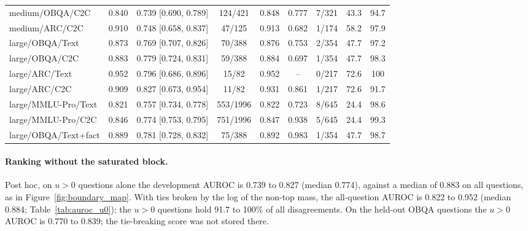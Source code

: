 \begin{table}[!htbp]
\begin{tabular*}{\linewidth}{@{}l@{\hspace{5pt}\extracolsep{\fill}}cccccccc@{}}
medium/OBQA/C2C & 0.840 & 0.739 [0.690, 0.789] & 124/421 & 0.848 & 0.777 & 7/321 & 43.3 & 94.7\\
medium/ARC/C2C & 0.910 & 0.748 [0.658, 0.837] & 47/125 & 0.913 & 0.682 & 1/174 & 58.2 & 97.9\\
large/OBQA/Text & 0.873 & 0.769 [0.707, 0.826] & 70/388 & 0.876 & 0.753 & 2/354 & 47.7 & 97.2\\
large/OBQA/C2C & 0.883 & 0.779 [0.724, 0.831] & 59/388 & 0.884 & 0.697 & 1/354 & 47.7 & 98.3\\
large/ARC/Text & 0.952 & 0.796 [0.686, 0.896] & 15/82 & 0.952 & -- & 0/217 & 72.6 & 100\\
large/ARC/C2C & 0.909 & 0.827 [0.673, 0.954] & 11/82 & 0.931 & 0.861 & 1/217 & 72.6 & 91.7\\
large/MMLU-Pro/Text & 0.821 & 0.757 [0.734, 0.778] & 553/1996 & 0.822 & 0.723 & 8/645 & 24.4 & 98.6\\
large/MMLU-Pro/C2C & 0.846 & 0.774 [0.753, 0.795] & 751/1996 & 0.847 & 0.938 & 5/645 & 24.4 & 99.3\\
large/OBQA/Text+fact & 0.889 & 0.781 [0.728, 0.832] & 75/388 & 0.892 & 0.983 & 1/354 & 47.7 & 98.7\\\bottomrule
\end{tabular*}
\end{table}

\paragraph{Ranking without the saturated block.} Post hoc, on $u>0$ questions alone the development AUROC is 0.739 to 0.827 (median 0.774), against a median of 0.883 on all questions, as in Figure~\ref{fig:boundary_map}. With ties broken by the log of the non-top mass, the all-question AUROC is 0.822 to 0.952 (median 0.884; Table~\ref{tab:auroc_u0}); the $u>0$ questions hold 91.7 to 100\% of all disagreements. On the held-out OBQA questions the $u>0$ AUROC is 0.770 to 0.839; the tie-breaking score was not stored there.

